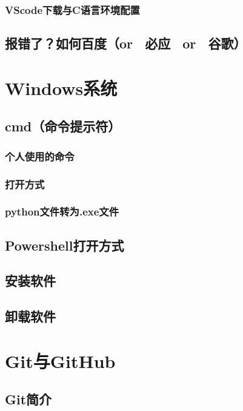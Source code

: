 \documentclass[12pt]{article}
\begin{document}
\subsubsection{VScode下载与C语言环境配置}

\subsection{报错了？如何百度（or~ 必应 ~or~ 谷歌）}

\section{Windows系统}

\subsection{cmd（命令提示符）}

\subsubsection{个人使用的命令}

\subsubsection{打开方式}

\subsubsection{python文件转为.exe文件}

\subsection{Powershell打开方式}

\subsection{安装软件}

\subsection{卸载软件}

\section{Git与GitHub}

\subsection{Git简介}
\end{document}
